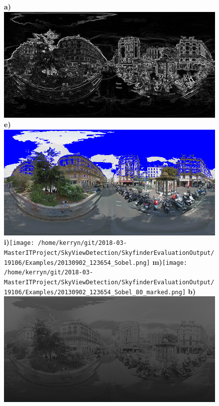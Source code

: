 \documentclass{article}
\begin{document}
\begin{figure}
\centering    
\textbf{\scriptsize{a)}}\includegraphics[scale=0.13]{Images/2/panorama-JtVHmEl7WCiz1xJ0bcJpBg-1_Sobel.png} %
\textbf{\scriptsize{e)}}\includegraphics[scale=0.13]{Images/2/panorama-JtVHmEl7WCiz1xJ0bcJpBg-1_Sobel_80_marked.png}%
\textbf{\scriptsize{i)}}\texttt{[image: /home/kerryn/git/2018-03-MasterITProject/SkyViewDetection/SkyfinderEvaluationOutput/19106/Examples/20130902\_123654\_Sobel.png]} %
\textbf{\scriptsize{m)}}\texttt{[image: /home/kerryn/git/2018-03-MasterITProject/SkyViewDetection/SkyfinderEvaluationOutput/19106/Examples/20130902\_123654\_Sobel\_80\_marked.png]} 
\textbf{\scriptsize{b)}}\includegraphics[scale=0.13]{Images/2/panorama-JtVHmEl7WCiz1xJ0bcJpBg-1_Sobel_prob.png} %

\end{figure}
\end{document}
